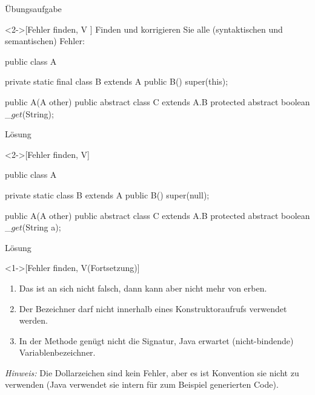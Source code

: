 \begin{frame}[c,fragile]{Übungsaufgabe}
    \begin{exercise}<2->[Fehler finden, V ]
        \pause{}Finden und korrigieren Sie alle (syntaktischen und semantischen) Fehler:\pause{}
{\footnotesize
        \begin{plainvoid}
public class A {
    private static final class B extends A {
        public B() {
            super(this);
        }
    }

    public A(A other){}
    public abstract class C extends A.B {
        protected abstract boolean _$get$(String);
    }
}
        \end{plainvoid}
}
    \end{exercise}
\end{frame}

\begin{frame}[c,fragile]{Lösung}
    \begin{solve}<2->[Fehler finden, V]
        \pause{}\footnotesize\begin{plainjava}
public class A {
    private static class B extends A {
        public B() {
            super(null);
        }
    }

    public A(A other){}
    public abstract class C extends A.B {
        protected abstract boolean _$get$(String a);
    }
}
        \end{plainjava}
    \end{solve}
\end{frame}

\begin{frame}[c]{Lösung}
    \addtocounter{solve}{-1}
    \begin{solve}<1->[Fehler finden, V\hfill{}(Fortsetzung)]
        \begin{enumerate}
            \item Das  ist an sich nicht falsch, dann kann aber  nicht mehr von  erben.
            \item Der Bezeichner  darf nicht innerhalb eines Konstruktoraufrufs verwendet werden.
            \item In der Methode  genügt nicht die Signatur,\pause{} Java erwartet (nicht-bindende) Variablenbezeichner.
        \end{enumerate}
        \pause{}\textit{Hinweis:}\pause{} Die Dollarzeichen sind kein Fehler,\pause{} aber es ist Konvention sie nicht zu verwenden (Java verwendet sie intern für zum Beispiel generierten Code).
    \end{solve}
\end{frame}

